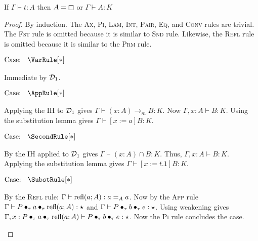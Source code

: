 \begin{lemma}
    \label{lem:2:classification}
    If $\Gamma \vdash t : A$ then $A = \kind$ or $\Gamma \vdash A : K$
\end{lemma}
\begin{proof}
    By induction.
    The \textsc{Ax}, \textsc{Pi}, \textsc{Lam}, \textsc{Int}, \textsc{Pair}, \textsc{Eq}, and \textsc{Conv} rules are trivial.
    The \textsc{Fst} rule is omitted because it is similar to \textsc{Snd} rule.
    Likewise, the \textsc{Refl} rule is omitted because it is similar to the \textsc{Prm} rule.

    $\text{Case: }\begin{array}{c} \VarRule[*] \end{array}$
    \begin{proofcase}
        Immediate by $\mathcal{D}_{1}$.
    \end{proofcase}

    $\text{Case: }\begin{array}{c} \AppRule[*] \end{array}$
    \begin{proofcase}
        Applying the IH to $\mathcal{D}_{1}$ gives $\Gamma \vdash (x : A) \to_m B : K$.
        Now $\Gamma, x : A \vdash B : K$.
        Using the substitution lemma gives $\Gamma \vdash [x := a]B : K$.
    \end{proofcase}

    $\text{Case: }\begin{array}{c} \SecondRule[*] \end{array}$
    \begin{proofcase}
        By the IH applied to $\mathcal{D}_{1}$ gives $\Gamma \vdash (x : A )\cap B : K$.
        Thus, $\Gamma, x : A \vdash B : K$.
        Applying the substitution lemma gives $\Gamma \vdash [x := t.1]B : K$.
    \end{proofcase}

    \begin{minipage}{.8\textwidth}$\text{Case: }\begin{array}{c} \SubstRule[*] \end{array}$\end{minipage}
    \begin{proofcase}
        By the \textsc{Refl} rule: $\Gamma \vdash \textnormal{refl}(a;A) : a =_A a$.
        Now by the \textsc{App} rule $\Gamma \vdash P \bullet_{\tau} a \bullet_{\tau} \textnormal{refl}(a;A) : \star$ and $\Gamma \vdash P \bullet_{\tau} b \bullet_{\tau} e : \star$.
        Using weakening gives $\Gamma, x : P \bullet_{\tau} a \bullet_{\tau} \textnormal{refl}(a;A) \vdash P \bullet_{\tau} b \bullet_{\tau} e : \star$.
        Now the \textsc{Pi} rule concludes the case.
    \end{proofcase}


\end{proof}
